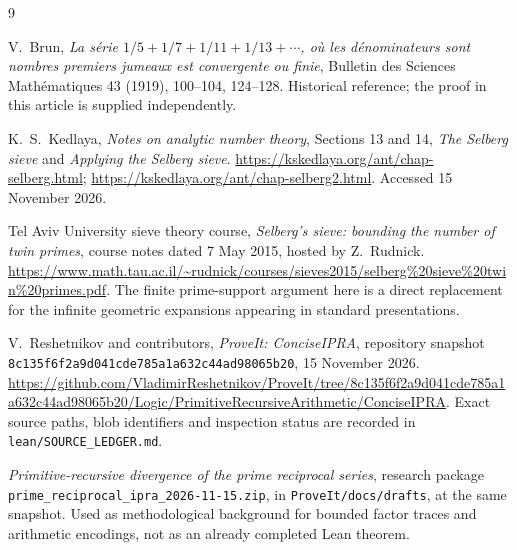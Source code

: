 \documentclass[11pt,a4paper]{article}
\theoremstyle{definition}
\newcommand{\code}[1]{\texttt{\small #1}}
\begin{document}
\begin{thebibliography}{9}
\raggedright
{}
V.~Brun, \emph{La s\'erie \(1/5+1/7+1/11+1/13+\cdots\), o\`u les
d\'enominateurs sont nombres premiers jumeaux est convergente ou finie},
Bulletin des Sciences Math\'ematiques 43 (1919), 100--104, 124--128.
Historical reference; the proof in this article is supplied independently.

K.~S.~Kedlaya, \emph{Notes on analytic number theory}, Sections 13 and 14,
\emph{The Selberg sieve} and \emph{Applying the Selberg sieve}.
\url{https://kskedlaya.org/ant/chap-selberg.html};
\url{https://kskedlaya.org/ant/chap-selberg2.html}.
Accessed 15 November 2026.

Tel Aviv University sieve theory course, \emph{Selberg's sieve:
bounding the number of twin primes}, course notes dated 7 May 2015,
hosted by Z.~Rudnick.
\url{https://www.math.tau.ac.il/~rudnick/courses/sieves2015/selberg%20sieve%20twin%20primes.pdf}.
The finite prime-support argument here is a direct replacement for the
infinite geometric expansions appearing in standard presentations.

V.~Reshetnikov and contributors, \emph{ProveIt: ConciseIPRA},
repository snapshot
\texttt{8c135f6f2a9d041cde785a1a632c44ad98065b20},
15 November 2026.
\url{https://github.com/VladimirReshetnikov/ProveIt/tree/8c135f6f2a9d041cde785a1a632c44ad98065b20/Logic/PrimitiveRecursiveArithmetic/ConciseIPRA}.
Exact source paths, blob identifiers and inspection status are recorded in
\code{lean/SOURCE\_LEDGER.md}.

\emph{Primitive-recursive divergence of the prime reciprocal series},
research package \code{prime\_reciprocal\_ipra\_2026-11-15.zip},
in \code{ProveIt/docs/drafts}, at the same snapshot.
Used as methodological background for bounded factor traces and arithmetic
encodings, not as an already completed Lean theorem.
\end{thebibliography}
\end{document}
